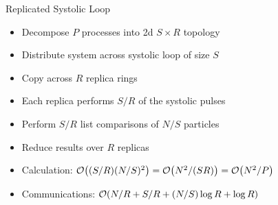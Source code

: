 \documentclass[xcolor={usenames, svgnames}]{beamer}
\begin{document}
\begin{frame}{Replicated Systolic Loop}
    \begin{center}
        \begin{minipage}{0.3\textwidth}
                \resizebox{\textwidth}{!}{
                    \slpic{}
                }
        \end{minipage}%
        \begin{minipage}{0.3\textwidth}
                \resizebox{\textwidth}{!}{
                    \slpic{}
                }
        \end{minipage}%
        \begin{minipage}{0.3\textwidth}
                \resizebox{\textwidth}{!}{
                    \slpic{}
                }
        \end{minipage}
    \end{center}

    \begin{itemize}
        \item Decompose $P$ processes into 2d $S\times{}R$ topology
        \item Distribute system across systolic loop of size $S$
        \item Copy across $R$ replica rings
        \item Each replica performs $S/R$ of the systolic pulses
        \item Perform $S/R$ list comparisons of $N/S$ particles
        \item Reduce results over $R$ replicas
        \item Calculation:
            $\mathcal{O}{\left({ (S/R)(N/S)^2 }\right)} = \mathcal{O}{\left({ N^2/(SR) }\right)} = \mathcal{O}{\left({ N^2/P }\right)}$
        \item Communications: $\mathcal{O}{\left({ N/R + S/R + (N/S)\log{R} + \log{R} }\right)}$
    \end{itemize}
\end{frame}
\end{document}
